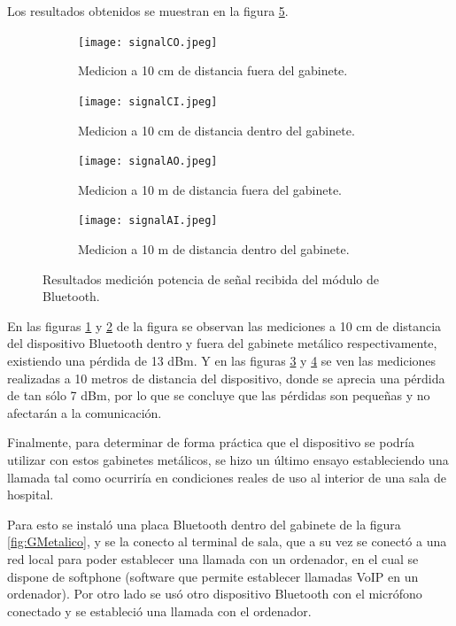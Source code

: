 Los resultados obtenidos se muestran en la figura \ref{fig:Psenal}.

\begin{figure}[!h]
	\centering
   	\begin{subfigure}[b]{0.45\textwidth}
   		\centering
      	\texttt{[image: signalCO.jpeg]}
      	\caption{Medicion a 10 cm de distancia fuera del gabinete.}
      	\label{fig:PsenalA}
   	\end{subfigure}%
   	\hfill
   	\begin{subfigure}[b]{0.45\textwidth}
   		\centering
      	\texttt{[image: signalCI.jpeg]}
      	\caption{Medicion a 10 cm de distancia dentro del gabinete.}
      	\label{fig:PsenalB}
   	\end{subfigure}%
   	\newline
   	\begin{subfigure}[b]{0.45\textwidth}
   		\centering
      	\texttt{[image: signalAO.jpeg]}
      	\caption{Medicion a 10 m de distancia fuera del gabinete.}
      	\label{fig:PsenalC}
   	\end{subfigure}%
   	\hfill
   	\begin{subfigure}[b]{0.45\textwidth}
   		\centering
      	\texttt{[image: signalAI.jpeg]}
      	\caption{Medicion a 10 m de distancia dentro del gabinete.}
      	\label{fig:PsenalD}
   	\end{subfigure}%
	\caption{Resultados medición potencia de señal recibida del módulo de Bluetooth.}
	\label{fig:Psenal}
\end{figure}

En las figuras \ref{fig:PsenalA} y \ref{fig:PsenalB} de la figura se observan las mediciones a 10 cm de distancia del dispositivo Bluetooth dentro y fuera del gabinete metálico respectivamente, existiendo una pérdida de 13 dBm. Y en las figuras \ref{fig:PsenalC} y \ref{fig:PsenalD} se ven las mediciones realizadas a 10 metros de distancia del dispositivo, donde se aprecia una pérdida de tan sólo 7 dBm, por lo que se concluye que las pérdidas son pequeñas y no afectarán a la comunicación.

Finalmente, para determinar de forma práctica que el dispositivo se podría utilizar con estos gabinetes metálicos, se hizo un último ensayo estableciendo una llamada tal como ocurriría  en condiciones reales de uso al interior de una sala de hospital.

Para esto se instaló una placa Bluetooth dentro del gabinete de la figura \ref{fig:GMetalico}, y se la conecto al terminal de sala, que a su vez se conectó a una red local para poder establecer una llamada con un ordenador, en el cual se dispone de softphone (software que permite establecer llamadas VoIP en un ordenador). Por otro lado se usó otro dispositivo Bluetooth con el micrófono conectado y se estableció una llamada con el ordenador.

